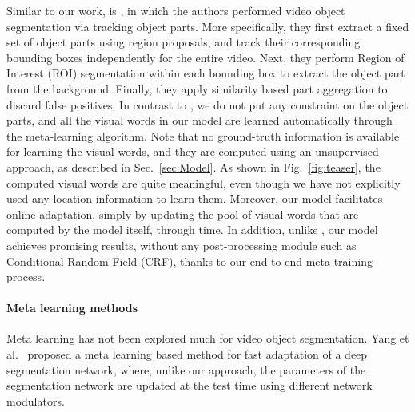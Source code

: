 \documentclass[10pt,twocolumn,letterpaper]{article}
\begin{document}
Similar to our work, is \cite{Cheng_2018_CVPR}, in which the authors performed video object segmentation via tracking object parts. More specifically, they first extract a fixed set of object parts using region proposals, and track their corresponding bounding boxes independently for the entire video. Next, they perform Region of Interest (ROI) segmentation within each bounding box to extract the object part from the background. Finally, they apply similarity based part aggregation to discard false positives.
In contrast to \cite{Cheng_2018_CVPR}, we do not put any constraint on the object parts, and all the visual words in our model are learned automatically through the meta-learning algorithm. Note that no ground-truth information is available for learning the visual words, and they are computed using an unsupervised approach, as described in Sec.~\ref{sec:Model}. As shown in Fig.~\ref{fig:teaser}, the computed visual words are quite meaningful, even though we have not explicitly used any location information to learn them. 
Moreover, our model facilitates online adaptation, simply by updating the pool of visual words that are computed by the model itself, through time.
In addition, unlike \cite{Cheng_2018_CVPR}, our model achieves promising results, without any post-processing module such as Conditional Random Field (CRF), thanks to our end-to-end meta-training process. 

\paragraph{Meta learning methods}
Meta learning has not been explored much for video object segmentation.
Yang et al.~\cite{Yang_2018_CVPR} proposed a meta learning based method for fast adaptation of a deep segmentation network, where, unlike our approach, the parameters of the segmentation network are updated at the test time using different network modulators. 
\end{document}
